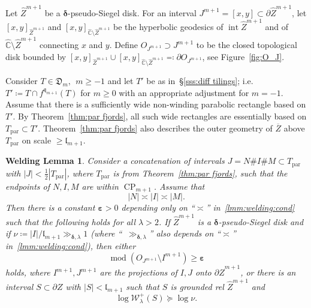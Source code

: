 \documentclass{amsart}
\renewcommand{\sp}{{\ \ }}
\newcommand{\1}{{\mathbb 1 }}
\newcommand{\Width}{{\mathcal W}}
\newcommand\intr{\operatorname{int}}
\newcommand{\wZ}{{\widehat Z}}
\newcommand{\qq}{\mathfrak{q}}
\newcommand{\length}{{\mathfrak l}}
\newcommand\parab{{\operatorname{par}}}
\newcommand{\wC}{\widehat{\mathbb{C}}}
\newcommand{\Dbb}{{\mathfrak{D}}}
\newtheorem{weldlmm}[thm]{Welding Lemma}
\theoremstyle{remark}
\numberwithin{equation}{section}
\theoremstyle{definition}
\renewcommand{\mod}{\operatorname{mod}}
\newcommand{\CP}{{\operatorname{CP}}}
\newcommand{\bdelta}{{\boldsymbol{ \delta}}}
\newcommand{\bvarepsilon}{{\boldsymbol{ \varepsilon}}}
\begin{document}
Let $\wZ^{m+1}$ be a $\bdelta$-pseudo-Siegel disk. For an interval $J^{m+1}=[x,y]\subset \partial \wZ^{m+1}$, let $[x,y]_{\wZ^{m+1}}$ and $[x,y]_{\wC\setminus \wZ^{m+1}}$ be the hyperbolic geodesics of $\intr \wZ^{m+1}$ and of $\wC\setminus \wZ^{m+1}$ connecting $x$ and $y$. Define $O_{J^{m+1}}\supset J^{m+1}$ to be the closed topological disk bounded by $[x,y]_{\wZ^{m+1}}\cup [x,y]_{\wC\setminus \wZ^{m+1}}\eqqcolon\partial O_{J^{m+1}}$, see Figure~\ref{fig:O_J}.


Consider $T\in \Dbb_m,\sp m\ge -1$ and let $T'$ be as in~\S\ref{sss:diff tilings}; i.e.~$T'\coloneqq T\cap f^{\qq_{m+1} }(T)$ for $m\ge 0$ with an appropriate adjustment for $m=-1.$ Assume that there is a sufficiently wide non-winding parabolic rectangle based on $T'$. By Theorem~\ref{thm:par fjords}, all such wide rectangles are essentially based  on $T_\parab\subset T'$. Theorem~\ref{thm:par fjords} also describes the outer geometry of $\overline Z$ above $T_\parab$ on scale $\ge \length_{m+1}$.


\begin{weldlmm}
\label{lmm:welding}
Consider a concatenation of intervals $J=N\# I\# M\subset T_\parab$ with $|J|<\frac 1 2 |T_\parab|$, where $T_\parab$ is from Theorem~\ref{thm:par fjords}, such that the endpoints of $N, I,M$ are within $\CP_{m+1}$. Assume that
\begin{equation}
\label{lmm:welding:cond}
|N|\asymp |I| \asymp |M|.
\end{equation}
Then there is a constant $\bvarepsilon>0$ depending only on ``$\asymp$'' in~\eqref{lmm:welding:cond} such that the following holds for all $\lambda>2$. If $\wZ^{m+1}$ is a $\bdelta$-pseudo-Siegel disk and if ${\nu\coloneqq |I|/\length_{m+1}\gg_{\bdelta,\lambda} 1}$ (where ``~$\gg_{\bdelta,\lambda}$'' also depends on ``$\asymp$'' in~\eqref{lmm:welding:cond}), then either 
\begin{equation}
\label{eq:1:lmm:welding}
\mod \left(O_{J^{m+1}}\setminus I^{m+1} \right)\ge \bvarepsilon
\end{equation}
holds, where $I^{m+1},J^{m+1}$ are the projections of $I,J$ onto $\partial \wZ^{m+1}$, or there is an interval $S\subset \partial Z$ with $|S|<\length_{m+1}$ such that $S$ is grounded rel $\wZ^{m+1}$ and
\begin{equation}
\label{eq:2:lmm:welding}
\log \Width^+_{\lambda}(S) \succeq  \log \nu.
\end{equation}
\end{weldlmm}
\end{document}
